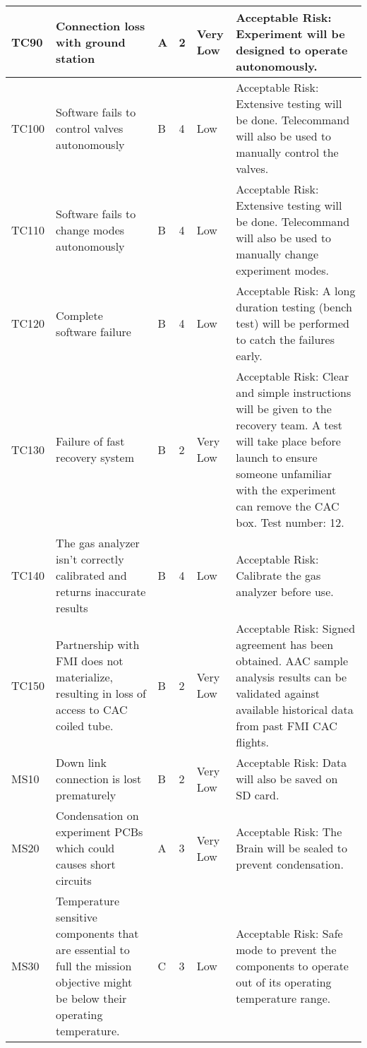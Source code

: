 \begin{longtable}{|m{}| m{} |m{} |m{}|m{}| m{}|}
TC90 & Connection loss with ground station & A & 2 & \cellcolor[HTML]{34FF34}Very Low & Acceptable Risk: Experiment will be designed to operate autonomously. \\ \hline
TC100 & Software fails to control valves autonomously & B & 4 & \cellcolor[HTML]{FCFF2F}Low & Acceptable Risk: Extensive testing will be done. Telecommand will also be used to manually control the valves. \\ \hline
TC110 & Software fails to change modes autonomously & B & 4 & \cellcolor[HTML]{FCFF2F}Low & Acceptable Risk: Extensive testing will be done. Telecommand will also be used to manually change experiment modes. \\ \hline
TC120 & Complete software failure & B & 4 & \cellcolor[HTML]{FCFF2F}Low & Acceptable Risk: A long duration testing (bench test) will be performed to catch the failures early. \\ \hline
TC130 & Failure of fast recovery system & B & 2 & \cellcolor[HTML]{34FF34}Very Low & Acceptable Risk: Clear and simple instructions will be given to the recovery team. A test will take place before launch to ensure someone unfamiliar with the experiment can remove the CAC box. Test number: 12. \\ \hline
TC140 & The gas analyzer isn't correctly calibrated and returns inaccurate results & B & 4 & \cellcolor[HTML]{FCFF2F}Low & Acceptable Risk: Calibrate the gas analyzer before use.\\ \hline 
TC150 & Partnership with FMI does not materialize, resulting in loss of access to CAC coiled tube. & B & 2 & \cellcolor[HTML]{34FF34}Very Low & Acceptable Risk: Signed agreement has been obtained. AAC sample analysis results can be validated against available historical data from past FMI CAC flights. \\ \hline 
MS10 & Down link connection is lost prematurely & B & 2 & \cellcolor[HTML]{34FF34}Very Low & Acceptable Risk: Data will also be saved on SD card. \\ \hline
MS20 & Condensation on experiment PCBs which could causes short circuits & A & 3 & \cellcolor[HTML]{34FF34}Very Low & Acceptable Risk: The Brain will be sealed to prevent condensation. \\ \hline
MS30 & Temperature sensitive components that are essential to full the mission objective might be below their operating temperature. & C & 3 & \cellcolor[HTML]{FCFF2F}Low & Acceptable Risk: Safe mode to prevent the components to operate out of its operating temperature range. \\ \hline

\end{longtable}
